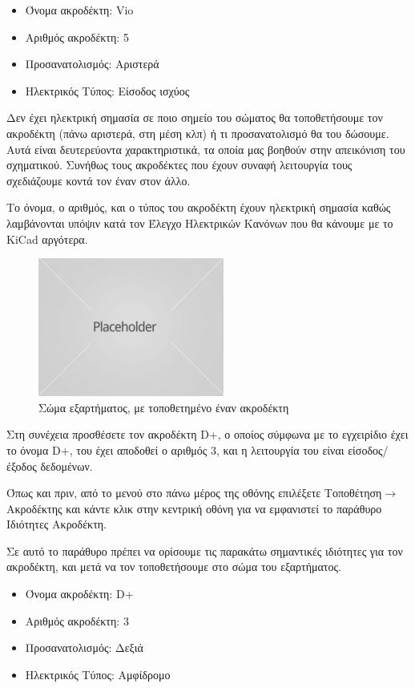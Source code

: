\documentclass[a4paper]{article}
\begin{document}
\begin{itemize}
    \item Όνομα ακροδέκτη: Vio
    \item Αριθμός ακροδέκτη: 5
    \item Προσανατολισμός: Αριστερά
    \item Ηλεκτρικός Τύπος: Είσοδος ισχύος
\end{itemize}

Δεν έχει ηλεκτρική σημασία σε ποιο σημείο του σώματος θα τοποθετήσουμε τον ακροδέκτη (πάνω αριστερά, στη μέση κλπ) ή τι προσανατολισμό θα του δώσουμε. Αυτά είναι δευτερεύοντα χαρακτηριστικά, τα οποία μας βοηθούν στην απεικόνιση του σχηματικού. Συνήθως τους ακροδέκτες που έχουν συναφή λειτουργία τους σχεδιάζουμε κοντά τον έναν στον άλλο.

Το όνομα, ο αριθμός, και ο τύπος του ακροδέκτη έχουν ηλεκτρική σημασία καθώς λαμβάνονται υπόψιν κατά τον Έλεγχο Ηλεκτρικών Κανόνων που θα κάνουμε με το KiCad αργότερα.

\begin{figure}
  \begin{center}
    \includegraphics{img/kicad-main.png}
    \caption{Σώμα εξαρτήματος, με τοποθετημένο έναν ακροδέκτη}
    \label{fig:kicad-main}
  \end{center}
\end{figure}

Στη συνέχεια προσθέσετε τον ακροδέκτη D+, ο οποίος σύμφωνα με το εγχειρίδιο έχει το όνομα D+, του έχει αποδοθεί ο αριθμός 3, και η λειτουργία του είναι είσοδος/έξοδος δεδομένων.

Όπως και πριν, από το μενού στο πάνω μέρος της οθόνης επιλέξετε Τοποθέτηση$\rightarrow$Ακροδέκτης και κάντε κλικ στην κεντρική οθόνη για να εμφανιστεί το παράθυρο Ιδιότητες Ακροδέκτη.

Σε αυτό το παράθυρο πρέπει να ορίσουμε τις παρακάτω σημαντικές ιδιότητες για τον ακροδέκτη, και μετά να τον τοποθετήσουμε στο σώμα του εξαρτήματος.

\begin{itemize}
    \item Όνομα ακροδέκτη: D+
    \item Αριθμός ακροδέκτη: 3
    \item Προσανατολισμός: Δεξιά
    \item Ηλεκτρικός Τύπος: Αμφίδρομο
\end{itemize}
\end{document}
